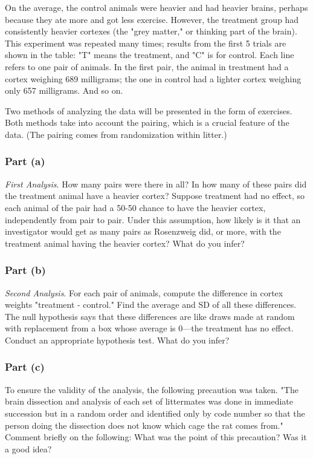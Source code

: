 \documentclass[11pt]{article}
\begin{document}
On the average, the control animals were heavier and had heavier brains, perhaps because they ate more and got less exercise.
However, the treatment group had consistently heavier cortexes (the "grey matter," or thinking part of the brain).
This experiment was repeated many times; results from the first 5 trials are shown in the table: "T" means the treatment, and "C" is for control.
Each line refers to one pair of animals.
In the first pair, the animal in treatment had a cortex weighing 689 milligrams; the one in control had a lighter cortex weighing only 657 milligrams.  And so on.

Two methods of analyzing the data will be presented in the form of exercises.
Both methods take into account the pairing, which is a crucial feature of the data.
(The pairing comes from randomization within litter.)

\subsubsection*{Part (a)}
\textit{First Analysis}.
How many pairs were there in all?
In how many of these pairs did the treatment animal have a heavier cortex?
Suppose treatment had no effect, so each animal of the pair had a 50-50 chance to have the heavier cortex, independently from pair to pair.
Under this assumption, how likely is it that an investigator would get as many pairs as Rosenzweig did, or more, with the treatment animal having the heavier cortex?
What do you infer?

\subsubsection*{Part (b)}
\textit{Second Analysis}.
For each pair of animals, compute the difference in cortex weights "treatment - control."
Find the average and SD of all these differences.
The null hypothesis says that these differences are like draws made at random with replacement from a box whose average is 0---the treatment has no effect.
Conduct an appropriate hypothesis test.
What do you infer?

\subsubsection*{Part (c)}
To ensure the validity of the analysis, the following precaution was taken.
"The brain dissection and analysis of each set of littermates was done in immediate succession but in a random order and identified only by code number so that the person doing the dissection does not know which cage the rat comes from."
Comment briefly on the following: What was the point of this precaution?
Was it a good idea?
\end{document}
